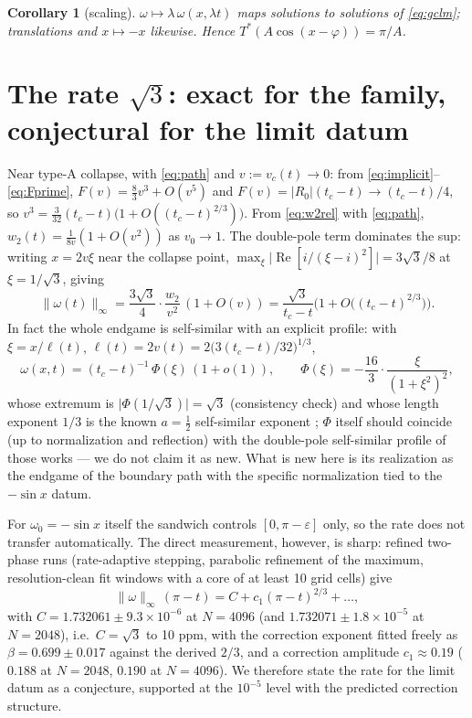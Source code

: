 \documentclass[11pt,a4paper]{article}
\theoremstyle{plain}
\newtheorem{corollary}{Corollary}
\theoremstyle{definition}
\theoremstyle{plain}
\newcommand{\nrm}[1]{\lVert #1 \rVert}
\newcommand{\abs}[1]{\lvert #1 \rvert}
\DeclareMathOperator{\Real}{Re}
\begin{document}
\begin{corollary}[scaling]
$\omega\mapsto\lambda\,\omega(x,\lambda t)$ maps solutions to solutions of \eqref{eq:gclm}; translations and $x\mapsto-x$ likewise. Hence $T^*(A\cos(x-\varphi))=\pi/A$.
\end{corollary}

\section{The rate \texorpdfstring{$\sqrt3$}{sqrt 3}: exact for the family, conjectural for the limit datum}\label{sec:rate}

Near type-A collapse, with \eqref{eq:path} and $v:=v_c(t)\to0$: from \eqref{eq:implicit}--\eqref{eq:Fprime}, $F(v)=\tfrac83v^3+O(v^5)$ and $F(v)=\abs{R_0}(t_c-t)\to(t_c-t)/4$, so $v^3=\tfrac{3}{32}(t_c-t)\big(1+O((t_c-t)^{2/3})\big)$. From \eqref{eq:w2rel} with \eqref{eq:path}, $w_2(t)=\frac{1}{8v}(1+O(v^2))$ as $v_0\to1$. The double-pole term dominates the sup: writing $x=2v\xi$ near the collapse point, $\max_\xi\abs{\Real[i/(\xi-i)^2]}=3\sqrt3/8$ at $\xi=1/\sqrt3$, giving
\[
\nrm{\omega(t)}_\infty=\frac{3\sqrt3}{4}\cdot\frac{w_2}{v^2}\,(1+O(v))=\frac{\sqrt3}{t_c-t}\Big(1+O\big((t_c-t)^{2/3}\big)\Big).
\]
In fact the whole endgame is self-similar with an explicit profile: with $\xi=x/\ell(t)$, $\ell(t)=2v(t)=2\big(3(t_c-t)/32\big)^{1/3}$,
\[
\omega(x,t)=(t_c-t)^{-1}\,\Phi(\xi)\,(1+o(1)),\qquad \Phi(\xi)=-\frac{16}{3}\cdot\frac{\xi}{(1+\xi^2)^2},
\]
whose extremum is $\abs{\Phi(1/\sqrt3)}=\sqrt3$ (consistency check) and whose length exponent $1/3$ is the known $a=\tfrac12$ self-similar exponent \cite{LSS21,Chen20}; $\Phi$ itself should coincide (up to normalization and reflection) with the double-pole self-similar profile of those works --- we do not claim it as new. What is new here is its realization as the endgame of the boundary path with the specific normalization tied to the $-\sin x$ datum.

For $\omega_0=-\sin x$ itself the sandwich controls $[0,\pi-\varepsilon]$ only, so the rate does not transfer automatically. The direct measurement, however, is sharp: refined two-phase runs (rate-adaptive stepping, parabolic refinement of the maximum, resolution-clean fit windows with a core of at least 10 grid cells) give
\[
\nrm{\omega}_\infty\,(\pi-t)=C+c_1(\pi-t)^{2/3}+\dots,
\]
with $C=1.732061\pm9.3\times10^{-6}$ at $N=4096$ (and $1.732071\pm1.8\times10^{-5}$ at $N=2048$), i.e.\ $C=\sqrt3$ to 10 ppm, with the correction exponent fitted freely as $\beta=0.699\pm0.017$ against the derived $2/3$, and a correction amplitude $c_1\approx0.19$ ($0.188$ at $N=2048$, $0.190$ at $N=4096$). We therefore state the rate for the limit datum as a conjecture, supported at the $10^{-5}$ level with the predicted correction structure.
\end{document}
